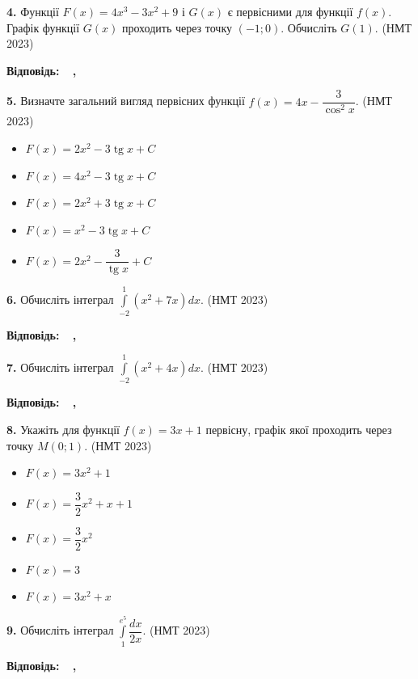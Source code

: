 \documentclass[14pt]{extarticle}
\newcommand{\answerListVertical}[5]{
    \vspace{0.2cm}
    \begin{itemize}[itemsep=0.4cm, leftmargin=1.5cm, labelsep=0.5cm]
        \item[\textbf{А}] #1
        \item[\textbf{Б}] #2
        \item[\textbf{В}] #3
        \item[\textbf{Г}] #4
        \item[\textbf{Д}] #5
    \end{itemize}
    \vspace{0.2cm}
}
\newcommand{\answerBox}{
    \noindent
    \textbf{Відповідь:} \quad
    \begingroup
    \setlength{\fboxsep}{8pt}
    \framebox{\phantom{0}}\,\framebox{\phantom{0}}\,\framebox{\phantom{0}}\,\framebox{\phantom{0}}
    \textbf{,}
    \framebox{\phantom{0}}\,\framebox{\phantom{0}}\,\framebox{\phantom{0}}
    \endgroup
}
\newcommand{\nmtyear}[1]{\hfill{\small\color{yearcolor}(НМТ #1)}}
\begin{document}
\vspace{1.0cm}

\noindent\textbf{4.} Функції $F(x) = 4x^3 - 3x^2 + 9$ і $G(x)$ є первісними для функції $f(x)$. Графік функції $G(x)$ проходить через точку $(-1; 0)$. Обчисліть $G(1)$. \nmtyear{2023}

\vspace{0.5cm}
\answerBox

\vspace{1.0cm}

\noindent\textbf{5.} Визначте загальний вигляд первісних функції $f(x) = 4x - \dfrac{3}{\cos^2 x}$. \nmtyear{2023}

\answerListVertical
{$F(x) = 2x^2 - 3\operatorname{tg} x + C$}
{$F(x) = 4x^2 - 3\operatorname{tg} x + C$}
{$F(x) = 2x^2 + 3\operatorname{tg} x + C$}
{$F(x) = x^2 - 3\operatorname{tg} x + C$}
{$F(x) = 2x^2 - \dfrac{3}{\operatorname{tg} x} + C$}

\vspace{0.5cm}

\noindent\textbf{6.} Обчисліть інтеграл $\displaystyle\int\limits_{-2}^{1} (x^2 + 7x) dx$. \nmtyear{2023}

\vspace{0.5cm}
\answerBox

\vspace{1.0cm}

\noindent\textbf{7.} Обчисліть інтеграл $\displaystyle\int\limits_{-2}^{1} (x^2 + 4x) dx$. \nmtyear{2023}

\vspace{0.5cm}
\answerBox

\vspace{1.0cm}

\noindent\textbf{8.} Укажіть для функції $f(x) = 3x + 1$ первісну, графік якої проходить через точку $M(0; 1)$. \nmtyear{2023}

\vspace{0.3cm}
\answerListVertical{$F(x)=3x^2+1$}{$F(x)=\dfrac{3}{2}x^2+x+1$}{$F(x)=\dfrac{3}{2}x^2$}{$F(x)=3$}{$F(x)=3x^2+x$}




\noindent\textbf{9.} Обчисліть інтеграл $\displaystyle\int\limits_1^{e^5} \dfrac{dx}{2x}$. \nmtyear{2023}

\vspace{0.5cm}
\answerBox

\vspace{1.0cm}
\end{document}
